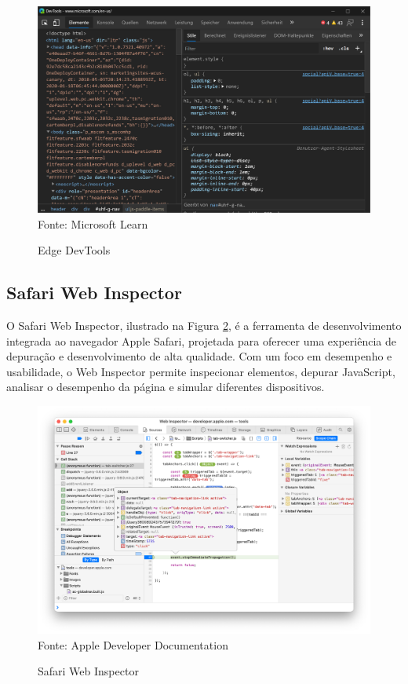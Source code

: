 \begin{figure}[!htb]
    \centering
    \caption{Edge DevTools}
    \includegraphics[width=0.8\linewidth]{../figuras/edge.png}\\
    {\footnotesize Fonte: Microsoft Learn}
    \label{fig:edge}
\end{figure}

\subsection{Safari Web Inspector}
O Safari Web Inspector, ilustrado na Figura \ref{fig:safari}, é a ferramenta de desenvolvimento integrada ao navegador Apple Safari, projetada para oferecer uma experiência de depuração e desenvolvimento de alta qualidade. Com um foco em desempenho e usabilidade, o Web Inspector permite inspecionar elementos, depurar JavaScript, analisar o desempenho da página e simular diferentes dispositivos\cite{apple}.
\begin{figure}[!htb]
    \centering
    \caption{Safari Web Inspector}
    \includegraphics[width=0.8\linewidth]{../figuras/safari.png}\\
    {\footnotesize Fonte: Apple Developer Documentation}
    \label{fig:safari}
\end{figure}




